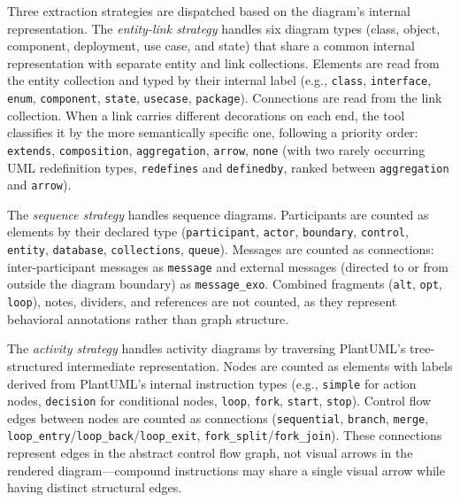 \documentclass[11pt]{article}
\begin{document}
Three extraction strategies are dispatched based on the diagram's internal representation. The \emph{entity-link strategy} handles six diagram types (class, object, component, deployment, use case, and state) that share a common internal representation with separate entity and link collections. Elements are read from the entity collection and typed by their internal label (e.g., \texttt{class}, \texttt{interface}, \texttt{enum}, \texttt{component}, \texttt{state}, \texttt{usecase}, \texttt{package}). Connections are read from the link collection. When a link carries different decorations on each end, the tool classifies it by the more semantically specific one, following a priority order: \texttt{extends}, \texttt{composition}, \texttt{aggregation}, \texttt{arrow}, \texttt{none} (with two rarely occurring UML redefinition types, \texttt{redefines} and \texttt{definedby}, ranked between \texttt{aggregation} and \texttt{arrow}).

The \emph{sequence strategy} handles sequence diagrams. Participants are counted as elements by their declared type (\texttt{participant}, \texttt{actor}, \texttt{boundary}, \texttt{control}, \texttt{entity}, \texttt{database}, \texttt{collections}, \texttt{queue}). Messages are counted as connections: inter-participant messages as \texttt{message} and external messages (directed to or from outside the diagram boundary) as \texttt{message\_exo}. Combined fragments (\texttt{alt}, \texttt{opt}, \texttt{loop}), notes, dividers, and references are not counted, as they represent behavioral annotations rather than graph structure.

The \emph{activity strategy} handles activity diagrams by traversing PlantUML's tree-structured intermediate representation. Nodes are counted as elements with labels derived from PlantUML's internal instruction types (e.g., \texttt{simple} for action nodes, \texttt{decision} for conditional nodes, \texttt{loop}, \texttt{fork}, \texttt{start}, \texttt{stop}). Control flow edges between nodes are counted as connections (\texttt{sequential}, \texttt{branch}, \texttt{merge}, \texttt{loop\_entry}/\texttt{loop\_back}/\texttt{loop\_exit}, \texttt{fork\_split}/\texttt{fork\_join}). These connections represent edges in the abstract control flow graph, not visual arrows in the rendered diagram---compound instructions may share a single visual arrow while having distinct structural edges.
\end{document}
